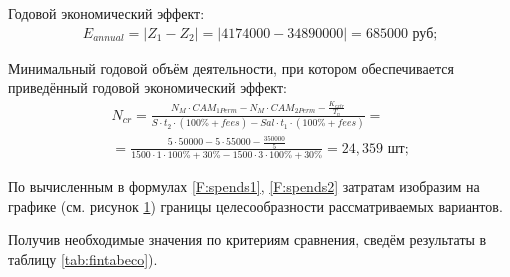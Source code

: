 Годовой экономический эффект:
\begin{equation}
	\begin{aligned}
		E_{annual}=|Z_1-Z_2|=|4174000-34890000|=685000 \text{ руб;}
	\end{aligned}
\end{equation}

Минимальный годовой объём деятельности, при котором обеспечивается приведённый годовой экономический эффект:
\begin{equation}
	\begin{aligned}
		N_{cr}=\frac{N_M \cdot CAM_{1Perm}-N_M \cdot CAM_{2Perm}-\frac{K_{extr}}{T_n}}{S \cdot t_2 \cdot (100\%+fees)-Sal \cdot t_1 \cdot (100\%+fees)}=\\=\frac{5 \cdot 50000-5 \cdot 55000-\frac{350000}{5}}{1500 \cdot 1 \cdot 100\%+30\%-1500 \cdot 3 \cdot 100\%+30\%}=24,359 \text{ шт;}
	\end{aligned}
\end{equation}

По вычисленным в формулах \ref{F:spends1}, \ref{F:spends2} затратам изобразим на графике (см. рисунок \ref{fig:economyborders}) границы целесообразности рассматриваемых вариантов.

\pgfplotsset{width=13cm,compat=1.9}
\begin{figure}[H]
	\centering
	\label{fig:economyborders}
\end{figure}

Получив необходимые значения по критериям сравнения, сведём результаты в таблицу \ref{tab:fintabeco}).

